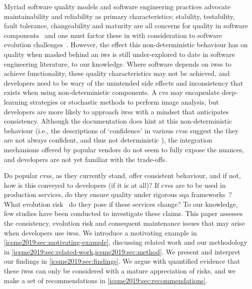 Myriad software quality models and software engineering practices advocate maintainability and reliability as primary characteristics; stability, testability, fault tolerance, changeability and maturity are all concerns for quality in software components~\citep{Pressman:2005vf,Sommerville:2011uc,Horch:2003uv} and one must factor these in with consideration to software evolution challenges~\citep{demeyer2008software,4659256,tu2000evolution,1572302,THOMAS2014457}. However, the effect this non-deterministic behaviour has on quality when masked behind  an \gls{iws} is still under-explored to date in software engineering literature, to our knowledge. Where software depends on \glspl{iws} to achieve functionality, these quality characteristics may not be achieved, and developers need to be wary of the unintended side effects and inconsistency that exists when using non-deterministic components. A \gls{cvs} may encapsulate deep-learning strategies or stochastic methods to perform image analysis, but developers are more likely to approach \glspl{iws} with a mindset that anticipates consistency. Although the documentation does hint at this non-deterministic behaviour (i.e., the descriptions of `confidence' in various \glspl{cvs} suggest the they are not always confident, and thus not deterministic  ), the integration mechanisms offered by popular vendors do not seem to fully expose the nuances, and developers are not yet familiar with the trade-offs.

Do popular \glspl{cvs}, as they currently stand, offer consistent behaviour, and if not, how is this conveyed to developers (if it is at all)? If \glspl{cvs} are to be used in production services, do they ensure quality under rigorous \gls{sqa} frameworks~\citep{Horch:2003uv}? What evolution risk~\citep{demeyer2008software,4659256,tu2000evolution,1572302} do they pose if these services change?
To our knowledge, few studies have been conducted to investigate these claims. This paper assesses the consistency, evolution risk and consequent maintenance issues that may arise when developers use \glspl{iws}. We introduce a motivating example in \cref{icsme2019:sec:motivating-example}, discussing related work and our methodology in \cref{icsme2019:sec:related-work,icsme2019:sec:method}. We present and interpret our findings in \cref{icsme2019:sec:findings}. We argue with quantified evidence that these \glspl{iws} can only be considered with a mature appreciation of risks, and we make a set of recommendations in \cref{icsme2019:sec:recommendations}.

